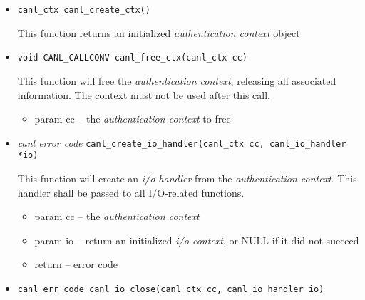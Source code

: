 \begin{itemize}
  \item \verb'canl_ctx canl_create_ctx()'

  This function
  returns an initialized \textit{authentication context} object
  \item \verb'void CANL_CALLCONV canl_free_ctx(canl_ctx cc)'

  This function will free the \textit{authentication context}, releasing 
  all associated information.  The context must not be used after this call.
  \begin{itemize}
    \item param cc -- the \textit{authentication context} to free
  \end{itemize}
  \item \textit{canl error code}
  \verb'canl_create_io_handler(canl_ctx cc, canl_io_handler *io)'

  This function will create an \textit{i/o handler} from the 
\textit{authentication context}. This handler shall be passed to
all I/O-related functions.
  \begin{itemize}
    \item param cc -- the \textit{authentication context}
    \item param io --  return an initialized \textit{i/o context}, 
or NULL if it did not succeed
    \item return -- \CANL error code
  \end{itemize}

  \item \verb'canl_err_code canl_io_close(canl_ctx cc, canl_io_handler io)'


\end{itemize}
